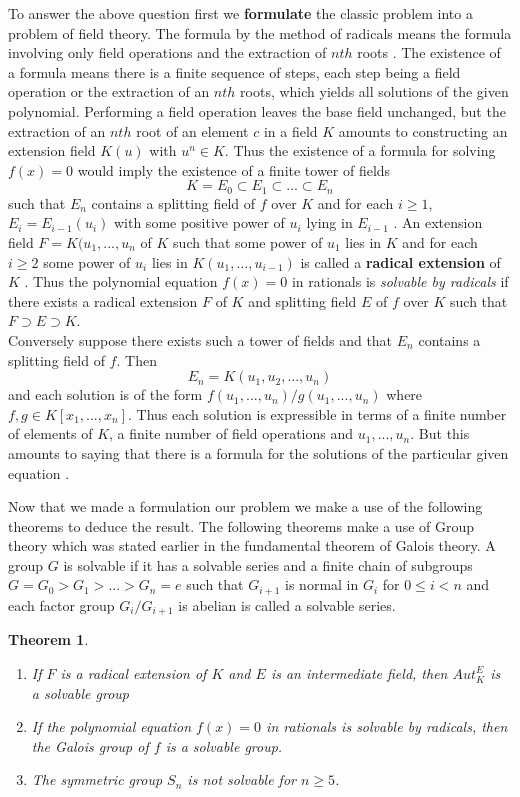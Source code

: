 \documentclass[a4paper,twoside,10pt]{article}
\theoremstyle{plain}
\newtheorem{theorem}{Theorem}[section]
\theoremstyle{definition}
\begin{document}
\noindent
To answer the above question first we \textbf{formulate} the classic problem into a problem of field theory. The formula by the method of radicals means the formula involving only field operations and the extraction of \(nth\) roots \cite{hunger}. The existence of a formula means there is a finite sequence of steps, each step being a field operation or the extraction of an \(nth\) roots, which yields all solutions of the given polynomial. Performing a field operation leaves the base field unchanged, but the extraction of an \(nth\) root of an element
\(c\) in a field \(K\) amounts to constructing an extension field \(K(u)\) with \(u^n \in K\). Thus the existence of a formula for solving \(f(x)=0\) would imply the existence of a finite tower of fields
\[K=E_0 \subset E_1 \subset ... \subset E_n\]
such that \(E_n\) contains a splitting field of \(f\) over \(K\) and for each \(i \geq 1\), \(E_i=E_{i-1}(u_i)\) with some positive power of \(u_i\) lying in \(E_{i-1}\) \cite{hunger}. An extension field \(F=K(u_1,...,u_n\) of \(K\) such that some power of \(u_1\) lies in \(K\) and for each \(i \geq 2\) some power of \(u_i\) lies in \(K(u_1,...,u_{i-1})\) is called a \textbf{radical extension} of \(K\) \cite{hunger}. Thus the polynomial equation \(f(x)=0\) in rationals is \textit{solvable by radicals} if there exists a radical extension \(F\) of \(K\) and splitting field \(E\) of \(f\) over \(K\) such that \(F \supset E \supset K\). \\[2mm]
Conversely suppose there exists such a tower of fields and that \(E_n\) contains a splitting field of \(f\). Then
\[E_n = K(u_1,u_2,...,u_n)\]
and each solution is of the form \(f(u_1,...,u_n)/g(u_1,...,u_n)\) where \(f,g \in K[x_1,...,x_n]\). Thus each solution is expressible in terms of a finite number of elements of \(K\), a finite number of field operations and \(u_1,...,u_n\). But this amounts to saying that there is a formula for the solutions of the particular given equation \cite{hunger}.

Now that we made a formulation our problem we make a use of the following theorems to deduce the result. The following theorems make a use of Group theory which was stated earlier in the fundamental theorem of Galois theory. A group \(G\) is solvable if it has a solvable series and a finite chain of subgroups \(G=G_0>G_1>...>G_n={e}\) such that \(G_{i+1}\) is normal in \(G_i\) for \(0 \leq i < n\) and  each factor group \(G_i/G_{i+1}\) is abelian is called a solvable series.
\begin{theorem} \cite{hunger}
  \begin{enumerate}
  \item If \(F\) is a radical extension of \(K\) and \(E\) is an intermediate field, then \(Aut_K^E\) is a solvable group
    \item If the polynomial equation \(f(x)=0\) in rationals is solvable by radicals, then the Galois group of \(f\) is a solvable group.
    \item The symmetric group \(S_n\) is not solvable for \(n \geq 5\).
      \end{enumerate}
\end{theorem}
\end{document}
